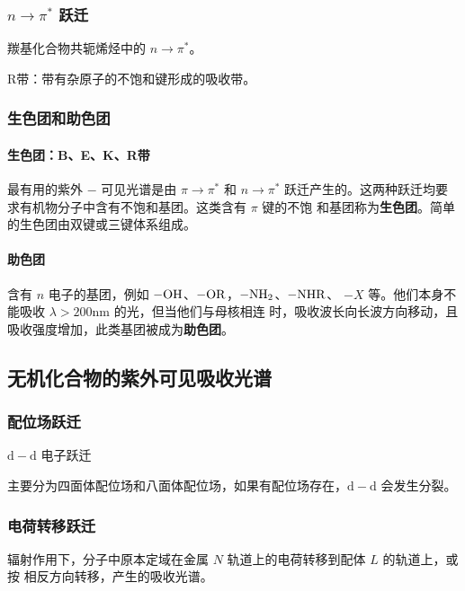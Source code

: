 \subsubsection{$n \rightarrow \pi^*$ 跃迁}

羰基化合物共轭烯烃中的 $n \rightarrow \pi^*$。

R带：带有杂原子的不饱和键形成的吸收带。

\subsubsection{生色团和助色团}

\paragraph{生色团：B、E、K、R带}

最有用的紫外 $-$ 可见光谱是由 $\pi \rightarrow \pi^*$ 和 $n \rightarrow \pi^*$
跃迁产生的。这两种跃迁均要求有机物分子中含有不饱和基团。这类含有 $\pi$ 键的不饱
和基团称为\textbf{生色团}。简单的生色团由双键或三键体系组成。

\paragraph{助色团}

含有 $n$ 电子的基团，例如 $\ce{-OH}$、$\ce{-OR}$，$\ce{-NH2}$、$-\ce{NHR}$、
$-X$ 等。他们本身不能吸收 $\lambda > 200 \mathrm{nm}$ 的光，但当他们与母核相连
时，吸收波长向长波方向移动，且吸收强度增加，此类基团被成为\textbf{助色团}。

\subsection{无机化合物的紫外可见吸收光谱}

\subsubsection{配位场跃迁}

$\mathrm{d} - \mathrm{d}$ 电子跃迁

主要分为四面体配位场和八面体配位场，如果有配位场存在，$\mathrm{d} - \mathrm{d}$
会发生分裂。

\subsubsection{电荷转移跃迁}

辐射作用下，分子中原本定域在金属 $N$ 轨道上的电荷转移到配体 $L$ 的轨道上，或按
相反方向转移，产生的吸收光谱。


